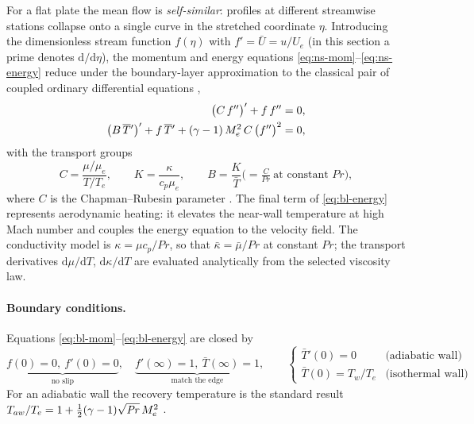 \documentclass[11pt]{article}
\begin{document}
For a flat plate the mean flow is \emph{self-similar}: profiles at different streamwise stations collapse
onto a single curve in the stretched coordinate $\eta$. Introducing the dimensionless stream function
$f(\eta)$ with $f'=\bar U=u/U_e$ (in this section a prime denotes $\mathrm d/\mathrm d\eta$), the momentum
and energy equations \eqref{eq:ns-mom}--\eqref{eq:ns-energy} reduce under the boundary-layer approximation
to the classical pair of coupled ordinary differential equations
\cite{white2006,ozgen2008},
\begin{align}
  \big(C\,f''\big)' + f\,f'' &= 0, \label{eq:bl-mom}\\
  \big(B\,\overline{T}{}'\big)' + f\,\overline{T}{}' + (\gamma-1)\,M_e^2\,C\,\big(f''\big)^2 &= 0, \label{eq:bl-energy}
\end{align}
with the transport groups
\begin{equation}\label{eq:transport}
  C=\frac{\mu/\mu_e}{T/T_e},\qquad K=\frac{\kappa}{c_p\mu_e},\qquad
  B=\frac{K}{\bar T}\Big(=\tfrac{C}{\mathit{Pr}}\ \text{at constant }\mathit{Pr}\Big),
\end{equation}
where $C$ is the Chapman--Rubesin parameter \cite{chapman1949}. The final term of \eqref{eq:bl-energy}
represents aerodynamic heating: it elevates the near-wall temperature at high Mach number and couples the
energy equation to the velocity field. The conductivity model is $\kappa=\mu c_p/\mathit{Pr}$, so that
$\bar\kappa=\bar\mu/\mathit{Pr}$ at constant $\mathit{Pr}$; the transport derivatives
$\mathrm d\mu/\mathrm dT$, $\mathrm d\kappa/\mathrm dT$ are evaluated analytically from the selected
viscosity law.

\paragraph{Boundary conditions.} Equations \eqref{eq:bl-mom}--\eqref{eq:bl-energy} are closed by
\begin{equation}\label{eq:blbc}
  \underbrace{f(0)=0,\ f'(0)=0}_{\text{no slip}},\quad
  \underbrace{f'(\infty)=1,\ \bar T(\infty)=1}_{\text{match the edge}},\qquad
  \begin{cases}\bar T{}'(0)=0 &\text{(adiabatic wall)}\\ \bar T(0)=T_w/T_e &\text{(isothermal wall)}\end{cases}
\end{equation}
For an adiabatic wall the recovery temperature is the standard result
$T_{aw}/T_e=1+\tfrac12(\gamma-1)\sqrt{\mathit{Pr}}\,M_e^2$ \cite{white2006}.
\end{document}
